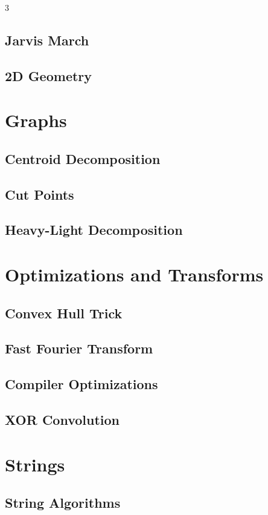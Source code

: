 \documentclass[8pt,a4paper,landscape,twoside]{extarticle}
\begin{document}
\begin{multicols*}{3}
\subsection{Jarvis March}


\subsection{2D Geometry}


\section{Graphs}

\subsection{Centroid Decomposition}


\subsection{Cut Points}


\subsection{Heavy-Light Decomposition}


\section{Optimizations and Transforms}

\subsection{Convex Hull Trick}


\subsection{Fast Fourier Transform}


\subsection{Compiler Optimizations}


\subsection{XOR Convolution}


\section{Strings}

\subsection{String Algorithms}


\end{multicols*}
\end{document}
